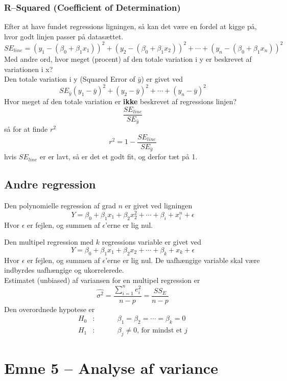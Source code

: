 \documentclass[11pt]{article}
\begin{document}
\subsubsection{R--Squared (Coefficient of Determination)}
Efter at have fundet regressions ligningen, så kan det være en fordel at kigge på, hvor godt linjen passer på datasættet. 
$$SE_{line}=(y_1-(\beta_0+\beta_1x_1))^2+(y_2-(\beta_0+\beta_1x_2))^2+\cdots+(y_n-(\beta_0+\beta_1x_n))^2$$
Med andre ord, hvor meget (procent) af den totale variation i y er beskrevet af variationen i x?\\[0.2cm]
Den totale variation i y (Squared Error of $\bar{y}$) er givet ved
$$SE_{\bar{y}}(y_1-\bar{y})^2+(y_2-\bar{y})^2+\cdots+(y_n-\bar{y})^2$$
Hvor meget af den totale variation er \textbf{ikke} beskrevet af regressions linjen? 
$$\frac{SE_{line}}{SE_{\bar{y}}}$$
så for at finde $r^2$
$$r^2=1-\frac{SE_{line}}{SE_{\bar{y}}}$$
hvis $SE_{line}$ er er lavt, så er det et godt fit, og derfor tæt på 1. 


\subsection{Andre regression}
Den polynomielle regression af grad $n$ er givet ved ligningen
$$Y=\beta_0+\beta_1x_1+\beta_2x_2^2+\cdots+\beta_i+x_i^n+\epsilon$$
Hvor $\epsilon$ er fejlen, og summen af $\epsilon$'erne er lig nul.

Den multipel regression med $k$ regressions variable er givet ved
$$Y=\beta_0+\beta_1x_1+\beta_2x_2+\cdots+\beta_k+x_k+\epsilon$$
Hvor $\epsilon$ er fejlen, og summen af $\epsilon$'erne er lig nul. De uafhængige variable skal være indbyrdes uafhængige og ukorrelerede.\\[0.2cm]
Estimatet (unbiased) af variansen for en multipel regression er
$$\hat{\sigma^2}=\frac{\sum^n_{i=1}e^2_i}{n-p}=\frac{SS_E}{n-p}$$
Den overordnede hypotese er
\begin{eqnarray*}
H_0&:&\hspace{1cm}\beta_1 = \beta_2 = \cdots =\beta_k = 0\\
H_1&:&\hspace{1cm}\beta_j \neq 0\text{, for mindst et }j
\end{eqnarray*}


\newpage
\section{Emne 5 -- Analyse af variance}
\end{document}
